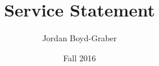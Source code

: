 \documentclass[11pt]{amsart}
\begin{document}
 \title{Service Statement}

 \author{Jordan Boyd-Graber}
\address{University of Colorado}

\date{Fall 2016}


\keywords{}

\maketitle






%
%
\end{document}
